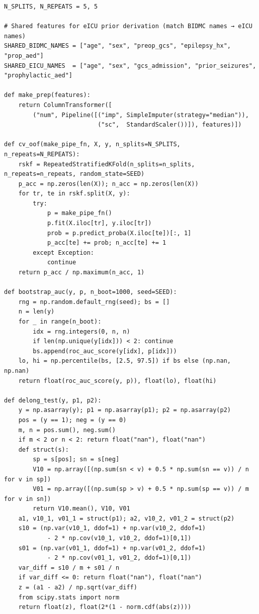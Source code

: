 \documentclass[11pt,a4paper]{article}
\begin{document}
\begin{lstlisting}[style=codeblock]
N_SPLITS, N_REPEATS = 5, 5

# Shared features for eICU prior derivation (match BIDMC names → eICU names)
SHARED_BIDMC_NAMES = ["age", "sex", "preop_gcs", "epilepsy_hx", "prop_aed"]
SHARED_EICU_NAMES  = ["age", "sex", "gcs_admission", "prior_seizures", "prophylactic_aed"]

def make_prep(features):
    return ColumnTransformer([
        ("num", Pipeline([("imp", SimpleImputer(strategy="median")),
                          ("sc",  StandardScaler())]), features)])

def cv_oof(make_pipe_fn, X, y, n_splits=N_SPLITS, n_repeats=N_REPEATS):
    rskf = RepeatedStratifiedKFold(n_splits=n_splits, n_repeats=n_repeats, random_state=SEED)
    p_acc = np.zeros(len(X)); n_acc = np.zeros(len(X))
    for tr, te in rskf.split(X, y):
        try:
            p = make_pipe_fn()
            p.fit(X.iloc[tr], y.iloc[tr])
            prob = p.predict_proba(X.iloc[te])[:, 1]
            p_acc[te] += prob; n_acc[te] += 1
        except Exception:
            continue
    return p_acc / np.maximum(n_acc, 1)

def bootstrap_auc(y, p, n_boot=1000, seed=SEED):
    rng = np.random.default_rng(seed); bs = []
    n = len(y)
    for _ in range(n_boot):
        idx = rng.integers(0, n, n)
        if len(np.unique(y[idx])) < 2: continue
        bs.append(roc_auc_score(y[idx], p[idx]))
    lo, hi = np.percentile(bs, [2.5, 97.5]) if bs else (np.nan, np.nan)
    return float(roc_auc_score(y, p)), float(lo), float(hi)

def delong_test(y, p1, p2):
    y = np.asarray(y); p1 = np.asarray(p1); p2 = np.asarray(p2)
    pos = (y == 1); neg = (y == 0)
    m, n = pos.sum(), neg.sum()
    if m < 2 or n < 2: return float("nan"), float("nan")
    def struct(s):
        sp = s[pos]; sn = s[neg]
        V10 = np.array([(np.sum(sn < v) + 0.5 * np.sum(sn == v)) / n for v in sp])
        V01 = np.array([(np.sum(sp > v) + 0.5 * np.sum(sp == v)) / m for v in sn])
        return V10.mean(), V10, V01
    a1, v10_1, v01_1 = struct(p1); a2, v10_2, v01_2 = struct(p2)
    s10 = (np.var(v10_1, ddof=1) + np.var(v10_2, ddof=1)
            - 2 * np.cov(v10_1, v10_2, ddof=1)[0,1])
    s01 = (np.var(v01_1, ddof=1) + np.var(v01_2, ddof=1)
            - 2 * np.cov(v01_1, v01_2, ddof=1)[0,1])
    var_diff = s10 / m + s01 / n
    if var_diff <= 0: return float("nan"), float("nan")
    z = (a1 - a2) / np.sqrt(var_diff)
    from scipy.stats import norm
    return float(z), float(2*(1 - norm.cdf(abs(z))))


\end{lstlisting}
\end{document}
